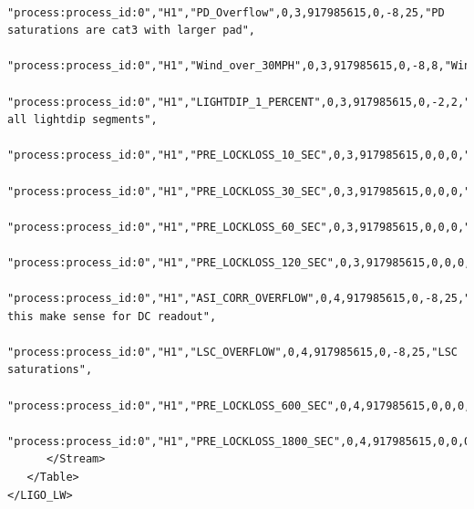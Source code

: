 {\begin{verbatim}
      "process:process_id:0","H1","PD_Overflow",0,3,917985615,0,-8,25,"PD saturations are cat3 with larger pad",
      "process:process_id:0","H1","Wind_over_30MPH",0,3,917985615,0,-8,8,"Windy",
      "process:process_id:0","H1","LIGHTDIP_1_PERCENT",0,3,917985615,0,-2,2,"Exclude all lightdip segments",
      "process:process_id:0","H1","PRE_LOCKLOSS_10_SEC",0,3,917985615,0,0,0,"",
      "process:process_id:0","H1","PRE_LOCKLOSS_30_SEC",0,3,917985615,0,0,0,"",
      "process:process_id:0","H1","PRE_LOCKLOSS_60_SEC",0,3,917985615,0,0,0,"",
      "process:process_id:0","H1","PRE_LOCKLOSS_120_SEC",0,3,917985615,0,0,0,"",
      "process:process_id:0","H1","ASI_CORR_OVERFLOW",0,4,917985615,0,-8,25,"Does this make sense for DC readout",
      "process:process_id:0","H1","LSC_OVERFLOW",0,4,917985615,0,-8,25,"LSC saturations",
      "process:process_id:0","H1","PRE_LOCKLOSS_600_SEC",0,4,917985615,0,0,0,"",
      "process:process_id:0","H1","PRE_LOCKLOSS_1800_SEC",0,4,917985615,0,0,0,""
      </Stream>
   </Table>
</LIGO_LW>
\end{verbatim}
}


